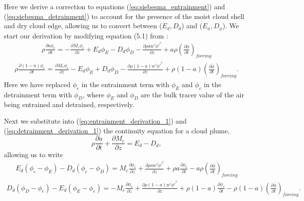 \documentclass[draft,grl]{agutex}
\begin{document}
\begin{article}
Here we derive a correction to equations (\ref{eq:siebesma_entrainment}) and 
(\ref{eq:siebesma_detrainment}) to account for the presence of the moist cloud 
shell and dry cloud edge, allowing us to convert between ($E_d, D_d$) and 
($E_\phi, D_\phi$).  We start our derivation by modifying equation (5.1) from
\cite{Siebesma1995}:
\begin{eqnarray}
  \label{eq:entrainment_derivation_1}
    \rho \frac{\partial a \phi_c}{\partial t} 
    = - \frac{\partial M_c \phi_c}{\partial z} 
    + E_d \phi_E - D_d \phi_D
    - \frac{\partial \rho a \overline{w' \phi'}^c}{\partial z} 
    + a \rho \left(\frac{\partial \bar{\phi}}{\partial t}\right)_{forcing}
\end{eqnarray}
\begin{eqnarray}
  \label{eq:detrainment_derivation_1}
    \rho \frac{\partial (1 - a) \phi_e}{\partial t}
    = \frac{\partial M_c \phi_e}{\partial z} 
    - E_d \phi_E + D_d \phi_D
    - \frac{\partial \rho (1 - a) \overline{w' \phi'}^e}{\partial z} 
    + \rho (1 - a) \left(\frac{\partial \bar{\phi}}{\partial t}\right)_{forcing}.
\end{eqnarray}
Here we have replaced $\phi_e$ in the entrainment term with $\phi_E$ and 
$\phi_c$ in the detrainment term with $\phi_D$, where $\phi_E$ and $\phi_D$ are 
the bulk tracer value of the air being entrained and detrained, respectively.

Next we substitute into (\ref{eq:entrainment_derivation_1}) and
(\ref{eq:detrainment_derivation_1}) the continuity equation for a cloud plume,
\begin{equation}
   \label{eq:continuity}
   \rho \frac{\partial a}{\partial t} 
   + \frac{\partial M_c}{\partial z} = E_d - D_d,
\end{equation}
allowing us to write
\begin{eqnarray}
  \label{eq:entrainment_derivation_2}
    E_d (\phi_c - \phi_E) - D_d (\phi_c - \phi_D)
    = M_c \frac{\partial \phi_c}{\partial z}
    + \frac{\partial \rho a \overline{w' \phi'}^c}{\partial z} 
    + \rho a \frac{\partial \phi_c}{\partial t}
    - a \rho \left(\frac{\partial \bar{\phi}}{\partial t}\right)_{forcing}
\end{eqnarray}
\begin{eqnarray}
  \label{eq:detrainment_derivation_2}
    D_d (\phi_D - \phi_e) - E_d (\phi_E - \phi_e)
    = - M_c \frac{\partial \phi_e}{\partial z}
    + \frac{\partial \rho (1 - a) \overline{w' \phi'}^e}{\partial z} 
    + \rho (1 - a) \frac{\partial \phi_e}{\partial t}
    - \rho (1 - a) \left(\frac{\partial \bar{\phi}}{\partial t}\right)_{forcing}.
\end{eqnarray}


\end{article}
\end{document}
